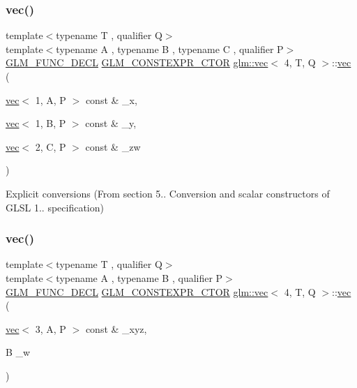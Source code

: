 \subsubsection{\texorpdfstring{vec()}{vec()}\hspace{0.1cm}{\footnotesize\ttfamily [13/34]}}
{\footnotesize\ttfamily template$<$typename T , qualifier Q$>$ \\
template$<$typename A , typename B , typename C , qualifier P$>$ \\
\mbox{\hyperlink{setup_8hpp_ab2d052de21a70539923e9bcbf6e83a51}{G\+L\+M\+\_\+\+F\+U\+N\+C\+\_\+\+D\+E\+CL}} \mbox{\hyperlink{setup_8hpp_ad34178a09666081abdb573c14d1f4a5a}{G\+L\+M\+\_\+\+C\+O\+N\+S\+T\+E\+X\+P\+R\+\_\+\+C\+T\+OR}} \mbox{\hyperlink{structglm_1_1vec}{glm\+::vec}}$<$ 4, T, Q $>$\+::\mbox{\hyperlink{structglm_1_1vec}{vec}} (\begin{DoxyParamCaption}\item[{\mbox{\hyperlink{structglm_1_1vec}{vec}}$<$ 1, A, P $>$ const \&}]{\+\_\+x,  }\item[{\mbox{\hyperlink{structglm_1_1vec}{vec}}$<$ 1, B, P $>$ const \&}]{\+\_\+y,  }\item[{\mbox{\hyperlink{structglm_1_1vec}{vec}}$<$ 2, C, P $>$ const \&}]{\+\_\+zw }\end{DoxyParamCaption})}



Explicit conversions (From section 5.. Conversion and scalar constructors of G\+L\+SL 1.. specification) 

\mbox{\label{structglm_1_1vec_3_014_00_01_t_00_01_q_01_4_af4d56895a23186981b30f2ef72a780c9}} 
\subsubsection{\texorpdfstring{vec()}{vec()}\hspace{0.1cm}{\footnotesize\ttfamily [14/34]}}
{\footnotesize\ttfamily template$<$typename T , qualifier Q$>$ \\
template$<$typename A , typename B , qualifier P$>$ \\
\mbox{\hyperlink{setup_8hpp_ab2d052de21a70539923e9bcbf6e83a51}{G\+L\+M\+\_\+\+F\+U\+N\+C\+\_\+\+D\+E\+CL}} \mbox{\hyperlink{setup_8hpp_ad34178a09666081abdb573c14d1f4a5a}{G\+L\+M\+\_\+\+C\+O\+N\+S\+T\+E\+X\+P\+R\+\_\+\+C\+T\+OR}} \mbox{\hyperlink{structglm_1_1vec}{glm\+::vec}}$<$ 4, T, Q $>$\+::\mbox{\hyperlink{structglm_1_1vec}{vec}} (\begin{DoxyParamCaption}\item[{\mbox{\hyperlink{structglm_1_1vec}{vec}}$<$ 3, A, P $>$ const \&}]{\+\_\+xyz,  }\item[{B}]{\+\_\+w }\end{DoxyParamCaption})}



